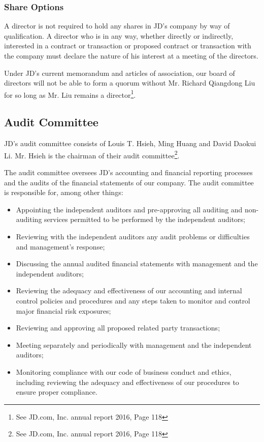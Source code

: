 \subsubsection{Share Options}
A director is not required to hold any shares in JD’s company by way of qualification. A director who is in any way, whether directly or indirectly, interested in a contract or transaction or proposed contract or transaction with the company must declare the nature of his interest at a meeting of the directors.

Under JD’s current memorandum and articles of association, our board of directors will not be able to form a quorum without Mr. Richard Qiangdong Liu for so long as Mr. Liu remains a director\footnote{See JD.com, Inc. annual report 2016, Page 118}.

\subsection{Audit Committee}
JD’s audit committee consists of Louis T. Hsieh, Ming Huang and David Daokui Li. Mr. Hsieh is the chairman of their audit committee\footnote{See JD.com, Inc. annual report 2016, Page 118}.

The audit committee oversees JD’s accounting and financial reporting processes and the audits of the financial statements of our company.
The audit committee is responsible for, among other things:
\begin{itemize}
\item Appointing the independent auditors and pre-approving all auditing and non-auditing services permitted to be performed by the independent auditors;
\item Reviewing with the independent auditors any audit problems or difficulties and management’s response;
\item Discussing the annual audited financial statements with management and the independent auditors;
\item Reviewing the adequacy and effectiveness of our accounting and internal control policies and procedures and any steps taken to monitor and control major financial risk exposures;
\item Reviewing and approving all proposed related party transactions;
\item Meeting separately and periodically with management and the independent auditors;
\item Monitoring compliance with our code of business conduct and ethics, including reviewing the adequacy and effectiveness of our procedures to ensure proper compliance.
\end{itemize}

